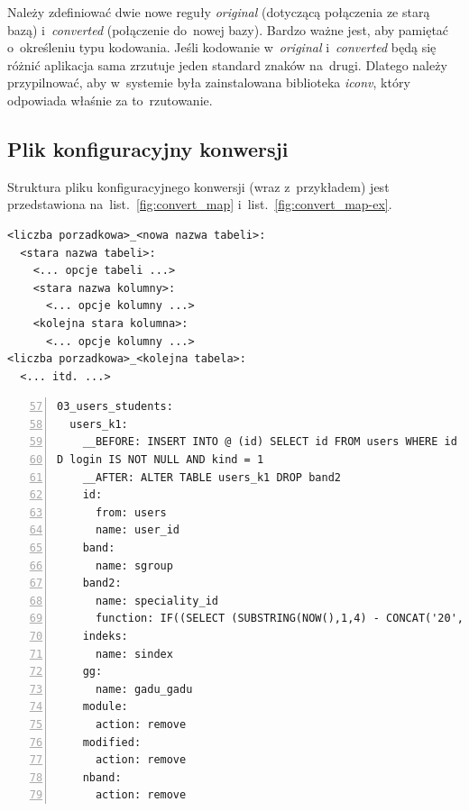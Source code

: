 \documentclass[a4paper,12pt,oneside]{report}
\begin{document}
Należy zdefiniować dwie nowe reguły \emph{original} (dotyczącą połączenia ze starą bazą) i~\emph{converted} (połączenie do~nowej bazy). Bardzo ważne jest, aby pamiętać o~określeniu typu kodowania. Jeśli kodowanie w~\emph{original} i~\emph{converted} będą się różnić aplikacja sama zrzutuje jeden standard znaków na~drugi. Dlatego należy przypilnować, aby w~systemie była zainstalowana biblioteka \emph{iconv}, który odpowiada właśnie za to~rzutowanie.

\subsection{Plik konfiguracyjny konwersji}
\label{sub:convert-conf}

Struktura pliku konfiguracyjnego konwersji (wraz z~przykładem) jest przedstawiona na~list.~\ref{fig:convert_map} i~list.~\ref{fig:convert_map-ex}.

\begin{lstlisting}[caption={Struktura pliku \emph{config/convert\_map.yml}},label=fig:convert_map,captionpos=b]
<liczba porzadkowa>_<nowa nazwa tabeli>:
  <stara nazwa tabeli>:
    <... opcje tabeli ...>
    <stara nazwa kolumny>:
      <... opcje kolumny ...>
    <kolejna stara kolumna>:
      <... opcje kolumny ...>
<liczba porzadkowa>_<kolejna tabela>:
  <... itd. ...>
\end{lstlisting}

\begin{lstlisting}[caption={Fragment pliku \emph{config/convert\_map.yml}},label=fig:convert_map-ex,captionpos=b,numbers=left,firstnumber=57]
03_users_students:
  users_k1:
    __BEFORE: INSERT INTO @ (id) SELECT id FROM users WHERE id NOT IN (SELECT id FROM users_k1) AND id NOT IN (SELECT id from users_k2) AN
D login IS NOT NULL AND kind = 1
    __AFTER: ALTER TABLE users_k1 DROP band2
    id:
      from: users
      name: user_id
    band:
      name: sgroup
    band2:
      name: speciality_id
      function: IF((SELECT (SUBSTRING(NOW(),1,4) - CONCAT('20', SUBSTRING(@, 2,2))) > 2),IF((SELECT SUBSTRING(@, 4,1)) > 3,2,3),1)
    indeks:
      name: sindex
    gg:
      name: gadu_gadu
    module:
      action: remove
    modified:
      action: remove
    nband:
      action: remove
\end{lstlisting}
\end{document}
